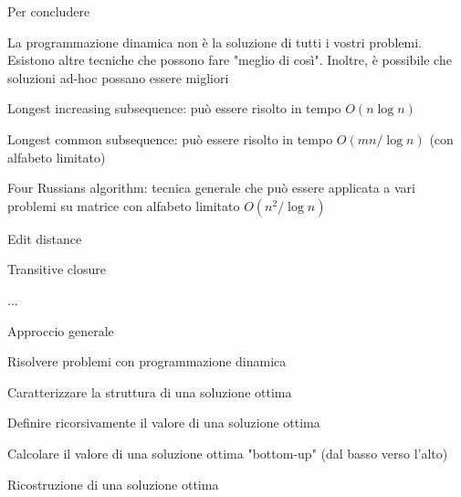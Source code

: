 \begin{frame}{Per concludere}

\vspace{-9pt}
\begin{myboxtitle}
La programmazione dinamica non è la soluzione di tutti i vostri problemi. Esistono altre tecniche che possono fare "meglio di così". Inoltre, è possibile che soluzioni ad-hoc possano essere migliori
\end{myboxtitle}

\begin{myboxtitle}[Esempi]
\BIL
\item \alert{Longest increasing subsequence}: può essere risolto in tempo $O(n \log n)$
\item \alert{Longest common subsequence}: può essere risolto in tempo $O(mn/\log n)$ (con alfabeto limitato)
\item \alert{Four Russians algorithm}: tecnica generale che può essere applicata a vari problemi su matrice con alfabeto limitato $O(n^2/\log n)$
\BI
\item Edit distance
\item Transitive closure
\item ...
\EI
\EIL
\end{myboxtitle}

\end{frame}

\begin{frame}{Approccio generale}

\vspace{-9pt}

\end{frame}

\begin{frame}{Risolvere problemi con programmazione dinamica}

\vspace{-9pt}
\begin{myboxtitle}[Fasi]
\BIL 
\item Caratterizzare la \alert{struttura} di una soluzione ottima
\item Definire ricorsivamente il \alert{valore} di una soluzione ottima
\item Calcolare il \alert{valore} di una soluzione ottima "bottom-up" (dal basso verso l'alto)
\item Ricostruzione di una soluzione ottima 
\EIL
\end{myboxtitle}

\end{frame}




